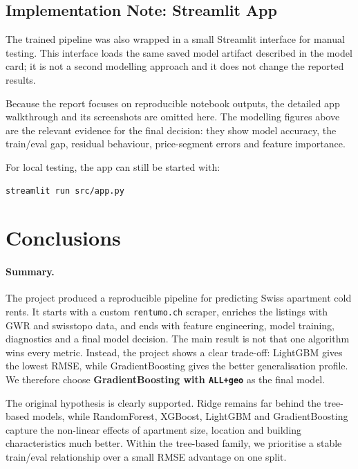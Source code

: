 \documentclass[11pt,a4paper]{article}
\begin{document}
\subsection{Implementation Note: Streamlit App}
\label{sec:app}
The trained pipeline was also wrapped in a small Streamlit interface for manual testing. This interface loads the same saved model artifact described in the model card; it is not a second modelling approach and it does not change the reported results.

Because the report focuses on reproducible notebook outputs, the detailed app walkthrough and its screenshots are omitted here. The modelling figures above are the relevant evidence for the final decision: they show model accuracy, the train/eval gap, residual behaviour, price-segment errors and feature importance.

For local testing, the app can still be started with:

\begin{verbatim}
streamlit run src/app.py
\end{verbatim}

\section{Conclusions}
\label{sec:conclusions}

\paragraph{Summary.}
The project produced a reproducible pipeline for predicting Swiss apartment cold rents. It starts with a custom \texttt{rentumo.ch} scraper, enriches the listings with GWR and swisstopo data, and ends with feature engineering, model training, diagnostics and a final model decision. The main result is not that one algorithm wins every metric. Instead, the project shows a clear trade-off: LightGBM gives the lowest RMSE, while GradientBoosting gives the better generalisation profile. We therefore choose \textbf{GradientBoosting with \texttt{ALL+geo}} as the final model.

The original hypothesis is clearly supported. Ridge remains far behind the tree-based models, while RandomForest, XGBoost, LightGBM and GradientBoosting capture the non-linear effects of apartment size, location and building characteristics much better. Within the tree-based family, we prioritise a stable train/eval relationship over a small RMSE advantage on one split.
\end{document}
